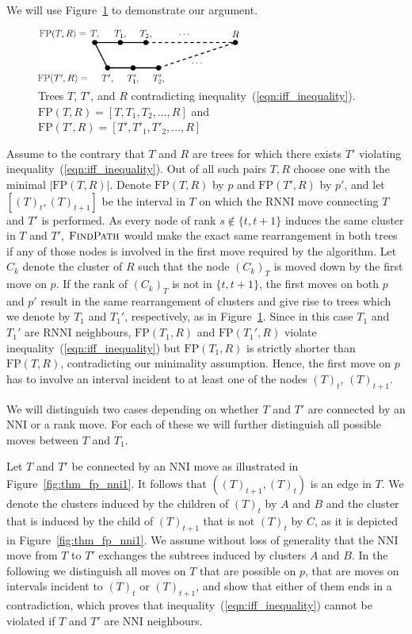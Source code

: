 \documentclass{amsart}
\newcommand{\rnni}{\mathrm{RNNI}}
\newcommand{\findpath}{\textsc{FindPath}}
\newcommand{\nni}{\mathrm{NNI}}
\newcommand{\fp}{\mathrm{FP}}
\begin{document}
We will use Figure~\ref{fig:proof_idea} to demonstrate our argument.

\begin{figure}[!hbt]
\centering
\includegraphics[width=0.6\textwidth]{proof_idea}
\vspace{12pt}
\caption{Trees $T$, $T'$, and $R$ contradicting inequality~(\ref{eqn:iff_inequality}).
$\fp(T,R) = [T,T_1,T_2, \ldots, R]$ and $\fp(T',R) = [T',T'_1,T'_2, \ldots, R]$}
\label{fig:proof_idea}
\end{figure}

Assume to the contrary that $T$ and $R$ are trees for which there exists $T'$ violating inequality~(\ref{eqn:iff_inequality}).
Out of all such pairs $T, R$ choose one with the minimal $|\fp(T, R)|$.
Denote $\fp(T,R)$ by $p$ and $\fp(T', R)$ by $p'$, and let $[(T)_t, (T)_{t+1}]$ be the interval in $T$ on which the $\rnni$ move connecting $T$ and $T'$ is performed.
As every node of rank $s \notin \{t, t+1\}$ induces the same cluster in $T$ and $T'$, $\findpath$ would make the exact same rearrangement in both trees if any of those nodes is involved in the first move required by the algorithm.
Let $C_k$ denote the cluster of $R$ such that the node $(C_k)_T$ is moved down by the first move on $p$.
If the rank of $(C_k)_T$ is not in $\{t, t+1\}$, the first moves on both $p$ and $p'$ result in the same rearrangement of clusters and give rise to trees which we denote by $T_1$ and $T_1'$, respectively, as in Figure~\ref{fig:proof_idea}.
Since in this case $T_1$ and $T_1'$ are $\rnni$ neighbours, $\fp(T_1, R)$  and $\fp(T_1', R)$ violate inequality~(\ref{eqn:iff_inequality}) but $\fp(T_1, R)$ is strictly shorter than $\fp(T, R)$, contradicting our minimality assumption.
Hence, the first move on $p$ has to involve an interval incident to at least one of the nodes $(T)_t$, $(T)_{t+1}$.

We will distinguish two cases depending on whether $T$ and $T'$ are connected by an $\nni$ or a rank move.
For each of these we will further distinguish all possible moves between $T$ and $T_1$.

Let $T$ and $T'$ be connected by an $\nni$ move as illustrated in Figure~\ref{fig:thm_fp_nni1}.
It follows that $((T)_{t+1},(T)_t)$ is an edge in $T$.
We denote the clusters induced by the children of $(T)_t$ by $A$ and $B$ and the cluster that is induced by the child of $(T)_{t+1}$ that is not $(T)_t$ by $C$, as it is depicted in Figure~\ref{fig:thm_fp_nni1}.
We assume without loss of generality that the $\nni$ move from $T$ to $T'$ exchanges the subtrees induced by clusters $A$ and $B$.
In the following we distinguish all moves on $T$ that are possible on $p$, that are moves on intervals incident to $(T)_t$ or $(T)_{t+1}$, and show that either of them ends in a contradiction, which proves that inequality~(\ref{eqn:iff_inequality}) cannot be violated if $T$ and $T'$ are $\nni$ neighbours.
\end{document}
